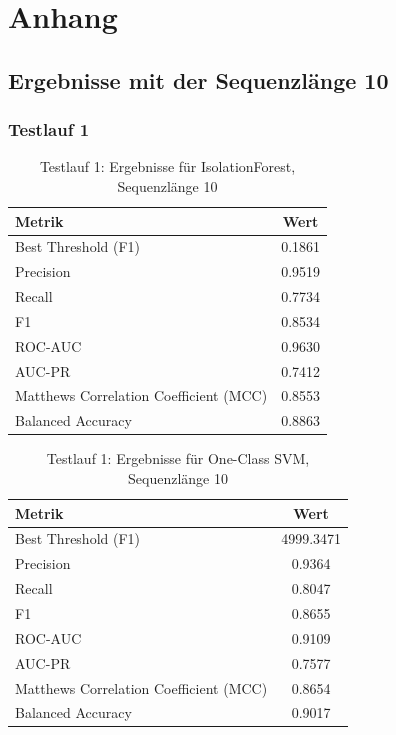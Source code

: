 \documentclass[a4paper,12pt]{article}
\begin{document}
\newpage
 
\newpage 
\renewcommand{\notesname}{Fußnotenverzeichnis}
\renewcommand{\enoteformat}{\rightskip0pt\leftskip0pt\vspace{0.5em}\noindent\makebox[2em][l]{\theenmark}}
\theendnotes
\newpage
\section*{Anhang}
\subsection{Ergebnisse mit der Sequenzlänge 10}
\subsubsection{Testlauf 1}
\begin{table}[H]
	\centering
	\begin{tabular}{lc}
		\hline
		Metrik & Wert \\
		\hline
		Best Threshold (F1) & 0.1861 \\
		Precision & 0.9519 \\
		Recall & 0.7734 \\
		F1 & 0.8534 \\
		ROC-AUC & 0.9630 \\
		AUC-PR & 0.7412 \\
		Matthews Correlation Coefficient (MCC) & 0.8553 \\
		Balanced Accuracy & 0.8863 \\
		\hline
	\end{tabular}
	\caption{Testlauf 1: Ergebnisse für IsolationForest, Sequenzlänge 10}
\end{table}

\begin{table}[H]
	\centering
	\begin{tabular}{l c}
		\hline
		Metrik & Wert \\
		\hline
		Best Threshold (F1) & 4999.3471 \\
		Precision & 0.9364 \\
		Recall & 0.8047 \\
		F1 & 0.8655 \\
		ROC-AUC & 0.9109 \\
		AUC-PR & 0.7577 \\
		Matthews Correlation Coefficient (MCC) & 0.8654 \\
		Balanced Accuracy & 0.9017 \\
		\hline
	\end{tabular}
	\caption{Testlauf 1: Ergebnisse für One-Class SVM, Sequenzlänge 10}
\end{table}
\end{document}
